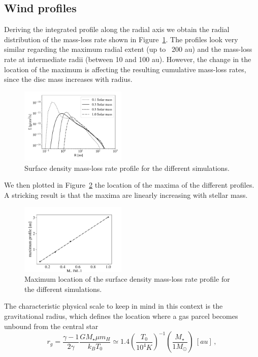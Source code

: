 \documentclass{aa}
\begin{document}
\subsection{Wind profiles}\label{sec:wind-prof}
Deriving the integrated profile along the radial axis we obtain the radial distribution of the mass-loss rate shown in Figure~\ref{fig:Sigmadot}. The profiles look very similar regarding the maximum radial extent (up to ~200 au) and the mass-loss rate at intermediate radii (between 10 and 100 au). However, the change in the location of the maximum is affecting the resulting cumulative mass-loss rates, since the disc mass increases with radius.
\begin{figure}
  \centering
  \includegraphics[width=0.45\textwidth]{Surfprofile}
  \caption{Surface density mass-loss rate profile for the different simulations. \label{fig:Sigmadot}}
\end{figure}
We then plotted in Figure~\ref{fig:maxProf} the location of the maxima of the different profiles. A stricking result is that the maxima are linearly increasing with stellar mass.
\begin{figure}
    \centering
    \includegraphics[width=0.45\textwidth]{maxProf}
    \caption{Maximum location of the surface density mass-loss rate profile for the different simulations. \label{fig:maxProf}}
\end{figure}
The characteristic physical scale to keep in mind in this context is the gravitational radius, which defines the location where a gas parcel becomes unbound from the central star 
\begin{equation}\label{eq:rg}
  r_g = \frac{\gamma-1}{2\gamma} \frac{GM_\star\mu m_H}{k_B T_0} \simeq 1.4 \left(\frac{T_0}{10^4 K}\right)^{-1} \left(\frac{M_\star}{1 M_\odot}\right) \ [au]\,,
\end{equation}
\end{document}
